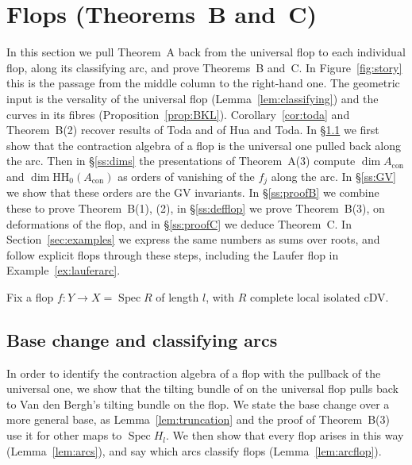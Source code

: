 \documentclass[11pt]{amsart}
\numberwithin{table}{section}
\numberwithin{figure}{section}
\numberwithin{equation}{section}
\theoremstyle{definition}
\theoremstyle{plain}
\newcommand{\Acon}{A_{\mathrm{con}}}
\newcommand{\HH}{\mathrm{HH}}
\DeclareMathOperator{\Spec}{Spec}
\begin{document}
%
\section{\texorpdfstring{Flops (Theorems~B and~C)}{Flops (Theorems B and C)}}\label{sec:flops}

In this section we pull Theorem~A back from the universal flop to each individual flop, along its classifying arc, and prove Theorems~B and~C. In Figure~\ref{fig:story} this is the passage from the middle column to the right-hand one. The geometric input is the versality of the universal flop (Lemma~\ref{lem:classifying}) and the curves in its fibres (Proposition~\ref{prop:BKL}). Corollary~\ref{cor:toda} and Theorem~B(2) recover results of Toda and of Hua and Toda. In \S\ref{ss:basechange} we first show that the contraction algebra of a flop is the universal one pulled back along the arc. Then in \S\ref{ss:dims} the presentations of Theorem~A(3) compute $\dim \Acon$ and $\dim \HH_0(\Acon)$ as orders of vanishing of the $f_j$ along the arc. In \S\ref{ss:GV} we show that these orders are the GV invariants. In \S\ref{ss:proofB} we combine these to prove Theorem~B(1), (2), in \S\ref{ss:defflop} we prove Theorem~B(3), on deformations of the flop, and in \S\ref{ss:proofC} we deduce Theorem~C. In Section~\ref{sec:examples} we express the same numbers as sums over roots, and follow explicit flops through these steps, including the Laufer flop in Example~\ref{ex:lauferarc}.

Fix a flop $f\colon Y \to X = \Spec R$ of length $l$, with $R$ complete local isolated cDV.

\subsection{Base change and classifying arcs}\label{ss:basechange}

In order to identify the contraction algebra of a flop with the pullback of the universal one, we show that the tilting bundle of \cite{K} on the universal flop pulls back to Van den Bergh's tilting bundle on the flop. We state the base change over a more general base, as Lemma~\ref{lem:truncation} and the proof of Theorem~B(3) use it for other maps to $\Spec H_l$. We then show that every flop arises in this way (Lemma~\ref{lem:arcs}), and say which arcs classify flops (Lemma~\ref{lem:arcflop}).
\end{document}
